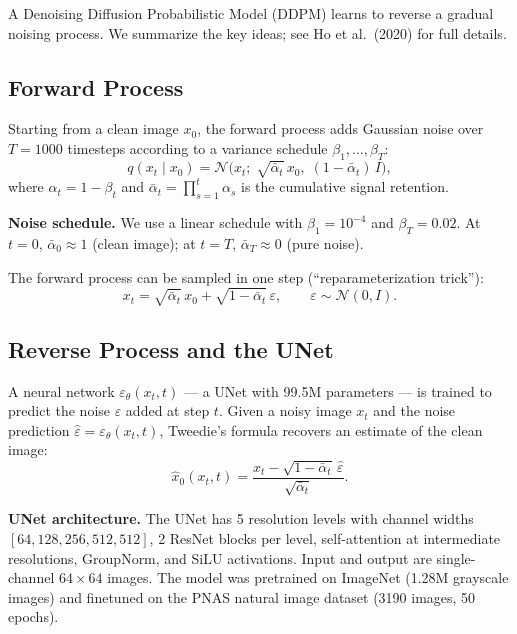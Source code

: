 \documentclass[11pt]{article}
\newcommand{\N}{\mathcal{N}}
\begin{document}
A Denoising Diffusion Probabilistic Model (DDPM) learns to reverse a gradual
noising process.  We summarize the key ideas; see Ho et al.\ (2020) for full
details.

\subsection{Forward Process}

Starting from a clean image $x_0$, the forward process adds Gaussian noise over
$T = 1000$ timesteps according to a variance schedule
$\beta_1, \ldots, \beta_T$:
\[
  q(x_t \mid x_0) = \N\!\bigl(x_t;\; \sqrt{\bar\alpha_t}\, x_0,\;
  (1 - \bar\alpha_t)\, I\bigr),
\]
where $\alpha_t = 1 - \beta_t$ and
$\bar\alpha_t = \prod_{s=1}^{t} \alpha_s$ is the cumulative signal retention.

\medskip
\noindent\textbf{Noise schedule.}
We use a linear schedule with $\beta_1 = 10^{-4}$ and $\beta_T = 0.02$.
At $t = 0$, $\bar\alpha_0 \approx 1$ (clean image);
at $t = T$, $\bar\alpha_T \approx 0$ (pure noise).

The forward process can be sampled in one step (``reparameterization trick''):
\begin{equation}\label{eq:forward}
  x_t = \sqrt{\bar\alpha_t}\, x_0 + \sqrt{1 - \bar\alpha_t}\, \varepsilon,
  \qquad \varepsilon \sim \N(0, I).
\end{equation}

\subsection{Reverse Process and the UNet}

A neural network $\varepsilon_\theta(x_t, t)$ --- a UNet with 99.5M parameters
--- is trained to predict the noise $\varepsilon$ added at step $t$.
Given a noisy image $x_t$ and the noise prediction $\hat\varepsilon = \varepsilon_\theta(x_t, t)$,
Tweedie's formula recovers an estimate of the clean image:
\begin{equation}\label{eq:tweedie}
  \hat x_0(x_t, t)
  = \frac{x_t - \sqrt{1 - \bar\alpha_t}\, \hat\varepsilon}{\sqrt{\bar\alpha_t}}.
\end{equation}

\medskip
\noindent\textbf{UNet architecture.}
The UNet has 5 resolution levels with channel widths $[64, 128, 256, 512, 512]$,
2 ResNet blocks per level, self-attention at intermediate resolutions,
GroupNorm, and SiLU activations.
Input and output are single-channel $64 \times 64$ images.
The model was pretrained on ImageNet (1.28M grayscale images) and finetuned on
the PNAS natural image dataset (3190 images, 50 epochs).
\end{document}
